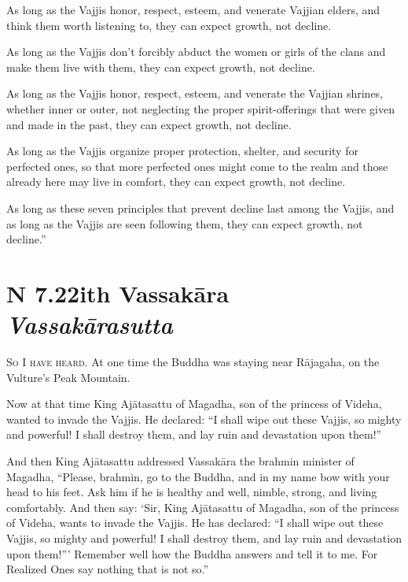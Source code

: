 \documentclass[12pt,openany]{book}%
\newcommand*{\suttatitleacronym}[1]{\smaller[2]{#1}\vspace*{.3em}}
\newcommand*{\suttatitletranslation}[1]{\linebreak{#1}}
\newcommand*{\suttatitleroot}[1]{\linebreak\smaller[2]\itshape{#1}}
\newcommand*{\tocacronym}[1]{\hspace*{-3.3em}{#1}\quad}
\newcommand*{\toctranslation}[1]{#1}
\newcommand*{\tocroot}[1]{(\textit{#1})}
\newcommand*{\scevam}[1]{\textsc{#1}}
\begin{document}
As long as the Vajjis honor, respect, esteem, and venerate Vajjian elders, and think them worth listening to, they can expect growth, not decline. 

As long as the Vajjis don’t forcibly abduct the women or girls of the clans and make them live with them, they can expect growth, not decline. 

As long as the Vajjis honor, respect, esteem, and venerate the Vajjian shrines, whether inner or outer, not neglecting the proper spirit-offerings that were given and made in the past, they can expect growth, not decline. 

As long as the Vajjis organize proper protection, shelter, and security for perfected ones, so that more perfected ones might come to the realm and those already here may live in comfort, they can expect growth, not decline. 

As long as these seven principles that prevent decline last among the Vajjis, and as long as the Vajjis are seen following them, they can expect growth, not decline.” 

%
\section*{{\suttatitleacronym AN 7.22}{\suttatitletranslation With Vassakāra }{\suttatitleroot Vassakārasutta}}
\addcontentsline{toc}{section}{\tocacronym{AN 7.22} \toctranslation{With Vassakāra } \tocroot{Vassakārasutta}}

\scevam{So I have heard. }At one time the Buddha was staying near \textsanskrit{Rājagaha}, on the Vulture’s Peak Mountain. 

Now at that time King \textsanskrit{Ajātasattu} of Magadha, son of the princess of Videha, wanted to invade the Vajjis. He declared: “I shall wipe out these Vajjis, so mighty and powerful! I shall destroy them, and lay ruin and devastation upon them!” 

And then King \textsanskrit{Ajātasattu} addressed \textsanskrit{Vassakāra} the brahmin minister of Magadha, “Please, brahmin, go to the Buddha, and in my name bow with your head to his feet. Ask him if he is healthy and well, nimble, strong, and living comfortably. And then say: ‘Sir, King \textsanskrit{Ajātasattu} of Magadha, son of the princess of Videha, wants to invade the Vajjis. He has declared: “I shall wipe out these Vajjis, so mighty and powerful! I shall destroy them, and lay ruin and devastation upon them!”’ Remember well how the Buddha answers and tell it to me. For Realized Ones say nothing that is not so.” 
\end{document}

